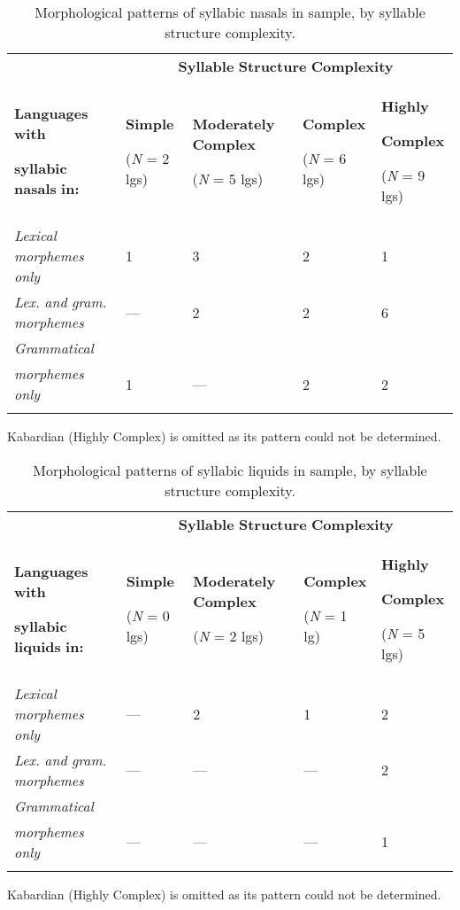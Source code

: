 \begin{table}
\begin{tabularx}{\textwidth}{XXXXX}
 & \multicolumn{4}{c}{ \textbf{Syllable} \textbf{Structure} \textbf{Complexity}}\\
\lsptoprule
{ \textbf{Languages} \textbf{with} }

 \textbf{syllabic} \textbf{nasals} \textbf{in:} & { \textbf{Simple}}

 (\textit{N} = 2 lgs) & { \textbf{Moderately} \textbf{Complex}}

 (\textit{N} = 5 lgs) & { \textbf{Complex}}

 (\textit{N} = 6 lgs) & { \textbf{Highly} }

{ \textbf{Complex}}

 (\textit{N} = 9 lgs)\\
 \textit{Lexical} \textit{morphemes} \textit{only} & 1 & 3 & 2 & 1\\
 \textit{Lex.} \textit{and} \textit{gram.} \textit{morphemes} & — & 2 & 2 & 6\\
 \textit{Grammatical} \\
\textit{morphemes} \textit{only} & 1 & — & 2 & 2\\
\lspbottomrule
\end{tabularx}
\caption{\label{3.9}Morphological patterns of syllabic nasals in sample, by syllable structure complexity.}Kabardian (Highly Complex) is omitted as its pattern could not be determined.
\end{table}




\begin{table}
\begin{tabularx}{\textwidth}{XXXXX}
 & \multicolumn{4}{c}{ \textbf{Syllable} \textbf{Structure} \textbf{Complexity}}\\
\lsptoprule
{ \textbf{Languages} \textbf{with} }

 \textbf{syllabic} \textbf{liquids} \textbf{in:} & { \textbf{Simple}}

 (\textit{N} = 0 lgs) & { \textbf{Moderately} \textbf{Complex}}

 (\textit{N} = 2 lgs) & { \textbf{Complex}}

 (\textit{N} = 1 lg) & { \textbf{Highly} }

{ \textbf{Complex}}

 (\textit{N} = 5 lgs)\\
 \textit{Lexical} \textit{morphemes} \textit{only} & — & 2 & 1 & 2\\
 \textit{Lex.} \textit{and} \textit{gram.} \textit{morphemes} & — & — & — & 2\\
 \textit{Grammatical} \\
\textit{morphemes} \textit{only} & — & — & — & 1\\
\lspbottomrule
\end{tabularx}
\caption{\label{3.10}Morphological patterns of syllabic liquids in sample, by syllable structure complexity.}Kabardian (Highly Complex) is omitted as its pattern could not be determined.
\end{table}




